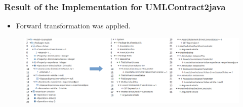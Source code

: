 \documentclass{beamer}
\begin{document}
\begin{frame}[t]
	\frametitle{Result of the Implementation for UMLContract2java}	
	\begin{itemize}
		\item Forward transformation was applied.
	\end{itemize}
	\begin{figure}
		\includegraphics[width=\textwidth]{umlContracts2java_Example01}
	\end{figure}
\end{frame}



\end{document}
